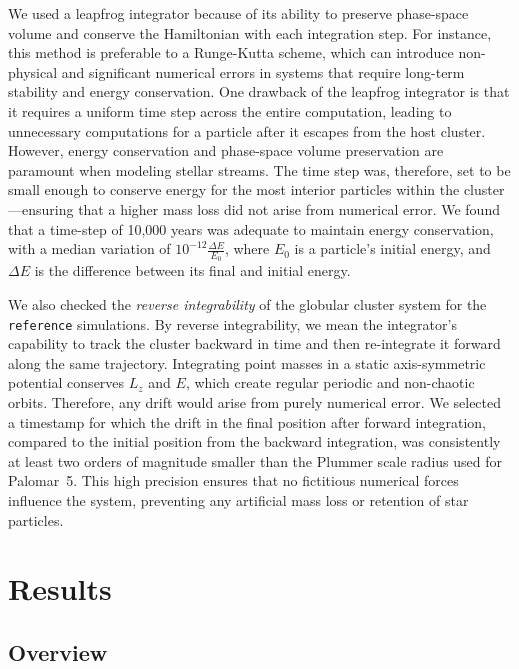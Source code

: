 \documentclass{aa}
\begin{document}
    We used a leapfrog integrator because of its ability to preserve phase-space volume and conserve the Hamiltonian with each integration step. For instance, this method is preferable to a Runge-Kutta scheme, which can introduce non-physical and significant numerical errors in systems that require long-term stability and energy conservation. One drawback of the leapfrog integrator is that it requires a uniform time step across the entire computation, leading to unnecessary computations for a particle after it escapes from the host cluster. However, energy conservation and phase-space volume preservation are paramount when modeling stellar streams. The time step was, therefore, set to be small enough to conserve energy for the most interior particles within the cluster---ensuring that a higher mass loss did not arise from numerical error. We found that a time-step of 10,000 years was adequate to maintain energy conservation, with a median variation of $10^{-12} \frac{\Delta E}{E_0}$, where $E_0$ is a particle's initial energy, and $\Delta E$ is the difference between its final and initial energy. 
    
    We also checked the \textit{reverse integrability} of the globular cluster system for the \texttt{reference} simulations. By reverse integrability, we mean the integrator's capability to track the cluster backward in time and then re-integrate it forward along the same trajectory. Integrating point masses in a static axis-symmetric potential conserves $L_z$ and $E$, which create regular periodic and non-chaotic orbits. Therefore, any drift would arise from purely numerical error. We selected a timestamp for which the drift in the final position after forward integration, compared to the initial position from the backward integration, was consistently at least two orders of magnitude smaller than the Plummer scale radius used for Palomar~5. This high precision ensures that no fictitious numerical forces influence the system, preventing any artificial mass loss or retention of star particles.

\section{Results}



  \subsection{Overview}
\end{document}
